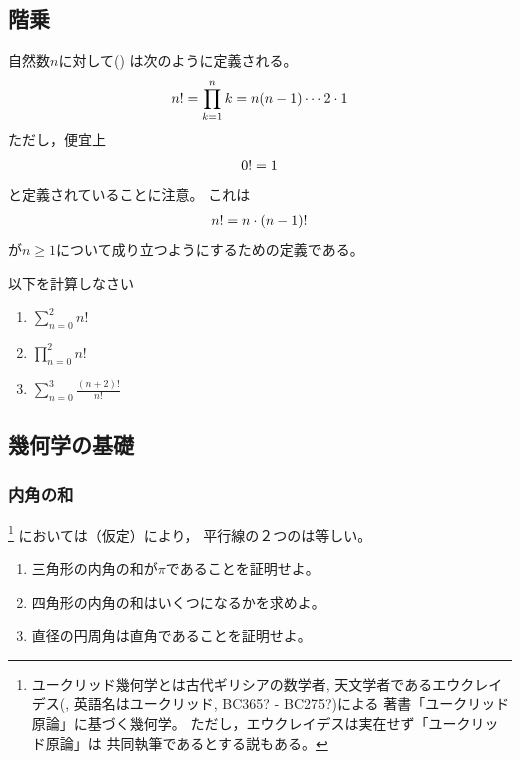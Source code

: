 \documentclass[twocolumn,11pt]{jarticle}
\begin{document}
\subsection{階乗}
自然数$n$に対して()
は次のように定義される。
\begin{align}
  n!=\prod_{k=1}^nk=n(n-1)\cdots2\cdot 1\notag
\end{align}
ただし，便宜上
\begin{align}
  0!=1\notag
\end{align}
と定義されていることに注意。
これは
\begin{align}
n!=n\cdot(n-1)!\notag
\end{align}
が$n\ge 1$について成り立つようにするための定義である。

\nquestion
以下を計算しなさい
\begin{enumerate}
\item\label{item:sum_n=(0-2)n!} $\displaystyle\sum_{n=0}^2n!$
\item\label{item:prod_n=(0-2)n!} $\displaystyle\prod_{n=0}^2n!$
\item\label{item:sum_n=(0-3)(n+2)!/n!} $\displaystyle\sum_{n=0}^3\frac{(n+2)!}{n!}$
\end{enumerate}

\subsection{幾何学の基礎}

\subsubsection{内角の和}

\footnote{ユークリッド幾何学とは古代ギリシアの数学者,
天文学者であるエウクレイデス(,
英語名はユークリッド, BC365? - BC275?)による
著書「ユークリッド原論」に基づく幾何学。
ただし，エウクレイデスは実在せず「ユークリッド原論」は
共同執筆であるとする説もある。
}
においては（仮定）により，
平行線の２つのは等しい。
\begin{enumerate}
\item 三角形の内角の和が$\pi$であることを証明せよ。
\item 四角形の内角の和はいくつになるかを求めよ。
\item 直径の円周角は直角であることを証明せよ。
\end{enumerate}
\end{document}
